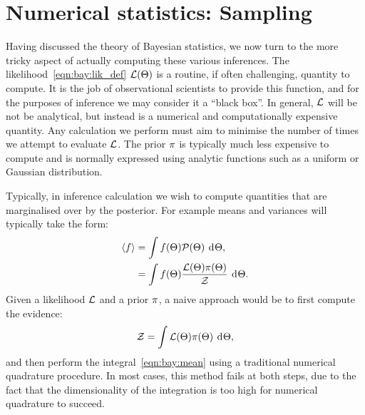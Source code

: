 \section{Numerical statistics: Sampling}
\label{sec:bay:samp}
Having discussed the theory of Bayesian statistics, we now turn to the more tricky aspect of actually computing these various inferences. The likelihood~\eqref{eqn:bay:lik_def} $\mathcal{L}(\Theta)$ is a routine, if often challenging, quantity to compute. It is the job of observational scientists to provide this function, and for the purposes of inference we may consider it a ``black box''. In general, $\mathcal{L}$ will be not be analytical, but instead is a numerical and computationally expensive quantity. Any calculation we perform must aim to minimise the number of times we attempt to evaluate $\mathcal{L}$. The prior $\pi$ is typically much less expensive to compute and is normally expressed using analytic functions such as a uniform or Gaussian distribution.

Typically, in inference calculation we wish to compute quantities that are marginalised over by the posterior. For example means and variances will typically take the form:
\begin{align}
  {\left\langle{f}\right\rangle} 
  &= \int f(\Theta)\mathcal{P}(\Theta)\:\operatorname{d}^{}\!{\Theta},
  \label{eqn:bay:mean}\\
  &= \int f(\Theta)\frac{\mathcal{L}(\Theta)\pi(\Theta)}{\mathcal{Z}}\:\operatorname{d}^{}\!{\Theta}.
\end{align}
Given a likelihood $\mathcal{L}$ and a prior $\pi$, a naive approach would be to first compute the evidence:
\begin{equation}
  \mathcal{Z} = \int \mathcal{L}(\Theta) \pi(\Theta) \: \operatorname{d}^{}\!{\Theta},
  \label{eqn:bay:ev_short}
\end{equation}
and then perform the integral~\eqref{eqn:bay:mean} using a traditional numerical quadrature procedure. In most cases, this method fails at both steps, due to the fact that the dimensionality of the integration is too high for numerical quadrature to succeed.

